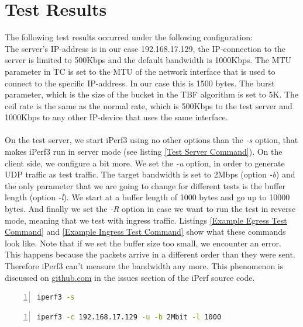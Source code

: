 \section{Test Results}\label{Test Results}
The following test results occurred under the following configuration:
\\
The server's \acs{IP}-address is in our case 192.168.17.129, the \acs{IP}-connection to the server is limited to 500Kbps and the default bandwidth is 1000Kbps. The \ac{MTU} parameter in \acs{TC} is set to the \acs{MTU} of the network interface that is used to connect to the specific \acs{IP}-address. In our case this is 1500 bytes. The burst parameter, which is the size of the bucket in the \acs{TBF} algorithm is set to 5K. The ceil rate is the same as the normal rate, which is 500Kbps to the test server and 1000Kbps to any other \acs{IP}-device that uses the same interface.
\\
\\
On the test server, we start iPerf3 using no other options than the \textit{-s} option, that makes iPerf3 run in server mode (see listing \ref{Test Server Command}). On the client side, we configure a bit more. We set the \textit{-u} option, in order to generate \acs{UDP} traffic as test traffic. The target bandwidth is set to 2Mbps (option \textit{-b}) and the only parameter that we are going to change for different tests is the buffer length (option \textit{-l}). We start at a buffer length of 1000 bytes and go up to 10000 bytes. And finally we set the \textit{-R} option in case we want to run the test in reverse mode, meaning that we test with ingress traffic. Listings \ref{Example Egress Test Command} and \ref{Example Ingress Test Command} show what these commands look like. Note that if we set the buffer size too small, we encounter an error. This happens because the packets arrive in a different order than they were sent. Therefore iPerf3 can't measure the bandwidth any more. This phenomenon is discussed on \href{https://github.com/esnet/iperf/issues/457}{github.com}\cite{mah2016iperfIssue} in the issues section of the iPerf source code.

\begin{lstlisting}[language=sh, caption = Test Server Command, captionpos=b, numbers=left, frame=single, breaklines=true, breakatwhitespace=true, showstringspaces=false, label=Test Server Command]
iperf3 -s
\end{lstlisting}
\newpage
\begin{lstlisting}[language=sh, caption = Example Egress Test Command, captionpos=b, numbers=left, frame=single, breaklines=true, breakatwhitespace=true, showstringspaces=false, label=Example Egress Test Command]
iperf3 -c 192.168.17.129 -u -b 2Mbit -l 1000
\end{lstlisting}

